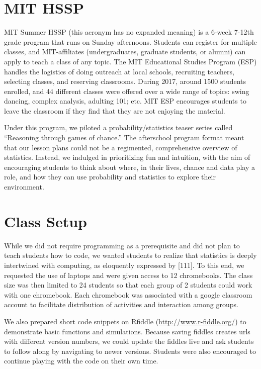 \documentclass[12pt,twoside]{mitthesis-manusdown}
\begin{document}
\section{MIT HSSP}\label{mit-hssp}

MIT Summer HSSP (this acronym has no expanded meaning) is a 6-week
7-12th grade program that runs on Sunday afternoons. Students can
register for multiple classes, and MIT-affiliates (undergraduates,
graduate students, or alumni) can apply to teach a class of any topic.
The MIT Educational Studies Program (ESP) handles the logistics of doing
outreach at local schools, recruiting teachers, selecting classes, and
reserving classrooms. During 2017, around 1500 students enrolled, and 44
different classes were offered over a wide range of topics: swing
dancing, complex analysis, adulting 101; etc. MIT ESP encourages
students to leave the classroom if they find that they are not enjoying
the material.

Under this program, we piloted a probability/statistics teaser series
called ``Reasoning through games of chance.'' The afterschool program
format meant that our lesson plans could not be a regimented,
comprehensive overview of statistics. Instead, we indulged in
prioritizing fun and intuition, with the aim of encouraging students to
think about where, in their lives, chance and data play a role, and how
they can use probability and statistics to explore their environment.

\section{Class Setup}\label{class-setup}

While we did not require programming as a prerequisite and did not plan
to teach students how to code, we wanted students to realize that
statistics is deeply intertwined with computing, as eloquently expressed
by {[}111{]}. To this end, we requested the use of laptops and were
given access to 12 chromebooks. The class size was then limited to 24
students so that each group of 2 students could work with one
chromebook. Each chromebook was associated with a google classroom
account to facilitate distribution of activities and interaction among
groups.

We also prepared short code snippets on Rfiddle
(\url{http://www.r-fiddle.org/}) to demonstrate basic functions and
simulations. Because saving fiddles creates urls with different version
numbers, we could update the fiddles live and ask students to follow
along by navigating to newer versions. Students were also encouraged to
continue playing with the code on their own time.
\end{document}
